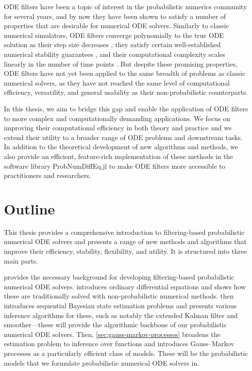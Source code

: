 \documentclass{mimosis}
\begin{document}
ODE filters have been a topic of interest in the probabilistic numerics community for several years, and by now they have been shown to satisfy a number of properties that are desirable for numerical ODE solvers.
Similarly to classic numerical simulators,
ODE filters converge polynomially to the true ODE solution as their step size decreases
\parencite{kersting18_conver_rates_gauss_ode_filter,tronarp20_bayes_ode_solver},
they satisfy certain well-established numerical stability guarantees
\parencite{tronarp18_probab_solut_to_ordin_differ},
and their computational complexity scales linearly in the number of time points
\parencite{schober16_probab_model_numer_solut_initial_value_probl}.
But despite these promising properties, ODE filters have not yet been applied to the same breadth of problems as classic numerical solvers, as they have not reached the same level of computational efficiency, versatility, and general usability as their non-probabilistic counterparts.

In this thesis, we aim to bridge this gap and enable the application of ODE filters to more complex and computationally demanding applications.
We focus on improving their computational efficiency in both theory and practice and we extend their utility to a broader range of ODE problems and downstream tasks.
In addition to the theoretical development of new algorithms and methods, we also provide an efficient, feature-rich implementation of these methods in the software library ProbNumDiffEq.jl to make ODE filters more accessible to practitioners and researchers.
\section*{Outline}
\label{sec:org81293da}

This thesis provides a comprehensive introduction to filtering-based probabilistic numerical ODE solvers and presents a range of new methods and algorithms that improve their efficiency, stability, flexibility, and utility.
It is structured into three main parts.

 provides the necessary background for developing filtering-based probabilistic numerical ODE solvers.
 introduces ordinary differential equations and shows how these are traditionally solved with non-probabilistic numerical methods.
 then introduces sequential Bayesian state estimation problems and presents various inference algorithms for these, such as notably the extended Kalman filter and smoother---these will provide the algorithmic backbone of our probabilistic numerical ODE solvers.
Then, \cref{sec:gauss-markov-processes} broadens the estimation problem to inference over functions
and introduces Gauss--Markov processes as a particularly efficient class of models.
These will be the probabilistic models that we formulate probabilistic numerical ODE solvers in.
\end{document}
